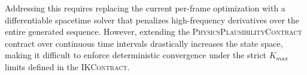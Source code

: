 \documentclass[sigconf,nonacm]{acmart}
\newcommand{\ikcontract}{\textsc{IKContract}}
\newcommand{\plausibility}{\textsc{PhysicsPlausibilityContract}}
\begin{document}
Addressing this requires replacing the current per-frame optimization with a
differentiable spacetime solver that penalizes high-frequency derivatives over
the entire generated sequence. However, extending the \plausibility{} contract
over continuous time intervals drastically increases the state space, making it
difficult to enforce deterministic convergence under the strict $K_{max}$ limits
defined in the \ikcontract{}.



\end{document}
